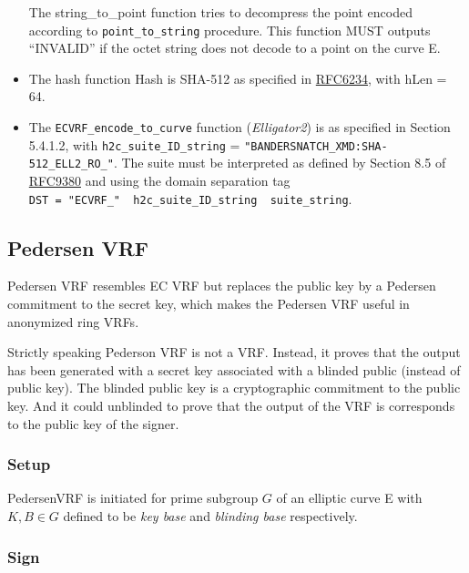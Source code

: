 \documentclass[
]{article}
\begin{document}
\begin{itemize}
  The string\_to\_point function tries to decompress the point encoded
  according to \texttt{point\_to\_string} procedure. This function MUST
  outputs ``INVALID'' if the octet string does not decode to a point on
  the curve E.
\item
  The hash function Hash is SHA-512 as specified in
  \href{https://www.rfc-editor.org/rfc/rfc6234}{RFC6234}, with hLen =
  64.
\item
  The \texttt{ECVRF\_encode\_to\_curve} function (\emph{Elligator2}) is
  as specified in Section 5.4.1.2, with \texttt{h2c\_suite\_ID\_string}
  = \texttt{"BANDERSNATCH\_XMD:SHA-512\_ELL2\_RO\_"}. The suite must be
  interpreted as defined by Section 8.5 of
  \href{https://datatracker.ietf.org/doc/rfc9380/}{RFC9380} and using
  the domain separation tag
  \texttt{DST\ =\ "ECVRF\_"\ \textbar{}\textbar{}\ h2c\_suite\_ID\_string\ \textbar{}\textbar{}\ suite\_string}.
\end{itemize}

\hypertarget{pedersen-vrf}{%
\subsection{Pedersen VRF}\label{pedersen-vrf}}

Pedersen VRF resembles EC VRF but replaces the public key by a Pedersen
commitment to the secret key, which makes the Pedersen VRF useful in
anonymized ring VRFs.

Strictly speaking Pederson VRF is not a VRF. Instead, it proves that the
output has been generated with a secret key associated with a blinded
public (instead of public key). The blinded public key is a
cryptographic commitment to the public key. And it could unblinded to
prove that the output of the VRF is corresponds to the public key of the
signer.

\hypertarget{setup}{%
\subsubsection{Setup}\label{setup}}

PedersenVRF is initiated for prime subgroup \(G\) of an elliptic curve E
with \(K, B \in G\) defined to be \emph{key base} and \emph{blinding
base} respectively.

\hypertarget{sign}{%
\subsubsection{Sign}\label{sign}}
\end{document}
